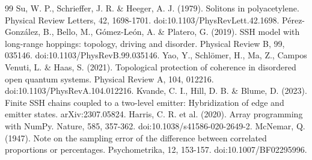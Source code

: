 \documentclass[11pt,a4paper]{article}
\begin{document}
\begin{thebibliography}{99}
 Su, W. P., Schrieffer, J. R. \& Heeger, A. J. (1979). Solitons in polyacetylene. Physical Review Letters, 42, 1698-1701. doi:10.1103/PhysRevLett.42.1698.
 Pérez-González, B., Bello, M., Gómez-León, A. \& Platero, G. (2019). SSH model with long-range hoppings: topology, driving and disorder. Physical Review B, 99, 035146. doi:10.1103/PhysRevB.99.035146.
 Yao, Y., Schlömer, H., Ma, Z., Campos Venuti, L. \& Haas, S. (2021). Topological protection of coherence in disordered open quantum systems. Physical Review A, 104, 012216. doi:10.1103/PhysRevA.104.012216.
 Kvande, C. I., Hill, D. B. \& Blume, D. (2023). Finite SSH chains coupled to a two-level emitter: Hybridization of edge and emitter states. arXiv:2307.05824.
 Harris, C. R. et al. (2020). Array programming with NumPy. Nature, 585, 357-362. doi:10.1038/s41586-020-2649-2.
 McNemar, Q. (1947). Note on the sampling error of the difference between correlated proportions or percentages. Psychometrika, 12, 153-157. doi:10.1007/BF02295996.
\end{thebibliography}
\end{document}
